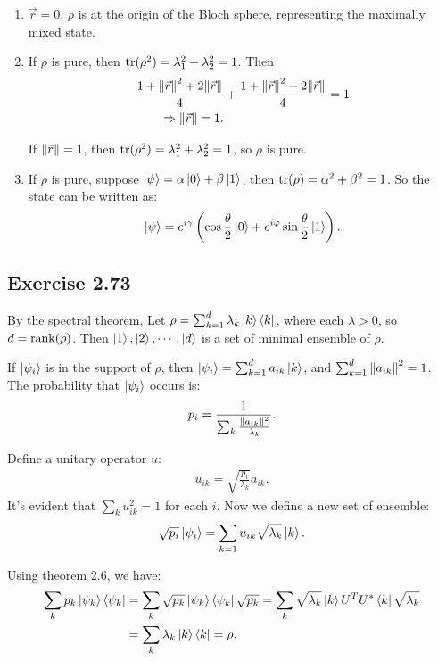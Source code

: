 \begin{enumerate}[(1)]
\item $\vec r = 0$, $\rho$ is at the origin of the Bloch sphere, representing the maximally mixed state.

\item If $\rho$ is pure, then ${\rm tr}(\rho^2)=\lambda_1^2+\lambda_2^2=1$. Then 
\begin{align}
\frac{1+\norm{\vec r}^2+2\norm{\vec r}}{4}&+\frac{1+\norm{\vec r}^2-2\norm{\vec r}}{4} = 1\\
\Rightarrow \norm{\vec r} =1.
\end{align}

If $\norm{\vec r} = 1$, then ${\rm tr}(\rho^2)=\lambda_1^2+\lambda_2^2=1$, so $\rho$ is pure.

\item If $\rho$ is pure, suppose $\ket{\psi} = \alpha\ket{0}+\beta\ket{1}$, then ${\rm tr}(\rho)=\alpha^2+\beta^2=1$. So the state can be written as:
\begin{align}
\ket{\psi}=e^{i\gamma}\left(\cos\frac{\theta}{2}\ket{0}+e^{i\varphi}\sin\frac{\theta}{2}\ket{1}\right).
\end{align}
\end{enumerate}

\subsection*{Exercise 2.73}
By the spectral theorem, Let $\rho = \sum_{k=1}^d\lambda_k \ket{k}\bra{k}$, where each $\lambda>0$, so $d = {\rm rank}(\rho)$. Then $\ket{1},\ket{2},\cdots,\ket{d}$ is a set of minimal ensemble of $\rho$.


If $\ket{\psi_i}$ is in the support of $\rho$, then $\ket{\psi_i}=\sum_{k=1}^d a_{ik}\ket{k}$, and $\sum_{k=1}^d \norm{a_{ik}}^2=1$. 
The probability that $\ket{\psi_i}$ occurs is:
\begin{align}
p_i=\frac{1}{\sum_k \frac{\norm{a_{ik}}^2}{\lambda_k}}.
\end{align}

Define a unitary operator $u$:
\begin{align}
u_{ik}=\sqrt{\frac{p_i}{\lambda_k}}a_{ik}.
\end{align}
It's evident that $\sum_k u_{ik}^2=1$ for each $i$. Now we define a new set of ensemble:
\begin{align}
\sqrt{p_i}\ket{\psi_i}=\sum_{k=1}u_{ik}\sqrt{\lambda_k}\ket{k}.
\end{align}

Using theorem 2.6, we have:
\begin{align}
\sum_k {p_k}\ket{\psi_k}\bra{\psi_k}&=\sum_k \sqrt{p_k}\ket{\psi_k}\bra{\psi_k}\sqrt{p_k}=\sum_k  \sqrt{\lambda_k}\ket{k}U^TU^*\bra{k}\sqrt{\lambda_k}\\
&=\sum_k \lambda_k \ket{k}\bra{k}=\rho.
\end{align}

